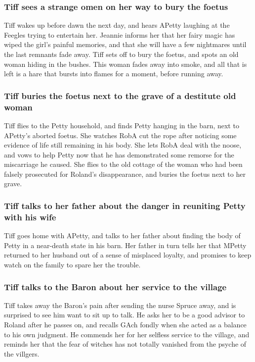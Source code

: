 \subsubsection{\Gls{Tiff} sees a strange omen on her way to bury the foetus}
\Gls{Tiff} wakes up before dawn the next day, and hears \Gls{APetty} laughing at the Feegles trying
to entertain her. \Gls{Jeannie} informs her that her fairy magic has wiped the girl's painful
memories, and that she will have a few nightmares until the last remnants fade away. \Gls{Tiff}
sets off to bury the foetus, and spots an old woman hiding in the bushes. This woman fades away
into smoke, and all that is left is a hare that bursts into flames for a moment, before running
away.

\subsubsection{\Gls{Tiff} buries the foetus next to the grave of a destitute old woman}
\Gls{Tiff} flies to the Petty household, and finds \Gls{Petty} hanging in the barn, next to
\Gls{APetty}'s aborted foetus. She watches \Gls{RobA} cut the rope after noticing some evidence of
life still remaining in his body. She lets \Gls{RobA} deal with the noose, and vows to help
\Gls{Petty} now that he has demonstrated some remorse for the miscarriage he caused. She flies to
the old cottage of the woman who had been falsely prosecuted for \Gls{Roland}'s disappearance, and
buries the foetus next to her grave.

\subsubsection{\Gls{Tiff} talks to her father about the danger in reuniting \Gls{Petty} with his
    wife}
\Gls{Tiff} goes home with \Gls{APetty}, and talks to her father about finding the body of
\Gls{Petty} in a near-death state in his barn. Her father in turn tells her that \Gls{MPetty}
returned to her husband out of a sense of misplaced loyalty, and promises to keep watch on the
family to spare her the trouble.

\subsubsection{\Gls{Tiff} talks to the \Gls{Baron} about her service to the village}
\Gls{Tiff} takes away the \Gls{Baron}'s pain after sending the nurse \Gls{Spruce} away, and is
surprised to see him want to sit up to talk. He asks her to be a good advisor to \Gls{Roland} after
he passes on, and recalls \Gls{GAch} fondly when she acted as a balance to his own judgment. He
commends her for her selfless service to the village, and reminds her that the fear of witches has
not totally vanished from the psyche of the villgers.

